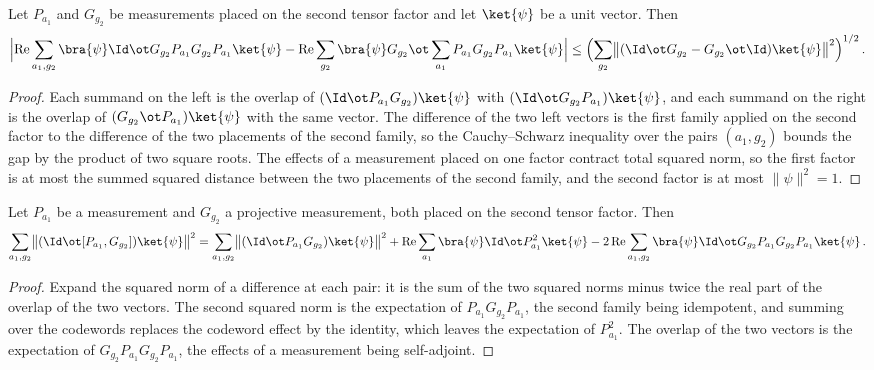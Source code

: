\begin{lemma}
	\label{lem:pasting-cross-move}
	\leanok
	Let $P_{a_1}$ and $G_{g_2}$ be measurements placed on the second tensor
	factor and let $\ket{\psi}$ be a unit vector. Then
	\[
		\Bigl| \operatorname{Re}\sum_{a_1, g_2}
			\bra{\psi} \Id \ot G_{g_2} P_{a_1} G_{g_2} P_{a_1}
			\ket{\psi} - \operatorname{Re}\sum_{g_2} \bra{\psi} G_{g_2} \ot \sum_{a_1} P_{a_1}
			G_{g_2} P_{a_1} \ket{\psi} \Bigr| \le \Bigl( \sum_{g_2} \bigl\|
			(\Id \ot G_{g_2} - G_{g_2} \ot \Id) \ket{\psi} \bigr\|^2
		\Bigr)^{1/2}\,.
	\]
\end{lemma}
\begin{proof}
	\leanok
	Each summand on the left is the overlap of
	$(\Id \ot P_{a_1} G_{g_2}) \ket{\psi}$ with
	$(\Id \ot G_{g_2} P_{a_1}) \ket{\psi}$, and each summand on the right is the
	overlap of $(G_{g_2} \ot P_{a_1}) \ket{\psi}$ with the same vector. The
	difference of the two left vectors is the first family applied on the second
	factor to the difference of the two placements of the second family, so the
	Cauchy--Schwarz inequality over the pairs $(a_1, g_2)$ bounds the gap by the
	product of two square roots. The effects of a measurement placed on one
	factor contract total squared norm, so the first factor is at most the
	summed squared distance between the two placements of the second family, and
	the second factor is at most $\|\psi\|^2 = 1$.
\end{proof}

\begin{lemma}
	\label{lem:pasting-commutator-expansion}
	\leanok
	Let $P_{a_1}$ be a measurement and $G_{g_2}$ a projective measurement, both
	placed on the second tensor factor. Then
	\[
		\sum_{a_1, g_2} \bigl\| (\Id \ot [P_{a_1}, G_{g_2}]) \ket{\psi} \bigr\|^2
		= \sum_{a_1, g_2} \bigl\| (\Id \ot P_{a_1} G_{g_2}) \ket{\psi} \bigr\|^2
			+ \operatorname{Re}\sum_{a_1} \bra{\psi} \Id \ot P_{a_1}^2 \ket{\psi}
			- 2 \operatorname{Re}\sum_{a_1, g_2}
				\bra{\psi} \Id \ot G_{g_2} P_{a_1} G_{g_2} P_{a_1}
				\ket{\psi}\,.
	\]
\end{lemma}
\begin{proof}
	\leanok
	Expand the squared norm of a difference at each pair: it is the sum of the
	two squared norms minus twice the real part of the overlap of the two
	vectors. The second squared norm is the expectation of
	$P_{a_1} G_{g_2} P_{a_1}$, the second family being idempotent, and summing
	over the codewords replaces the codeword effect by the identity, which
	leaves the expectation of $P_{a_1}^2$. The overlap of the two vectors is the
	expectation of $G_{g_2} P_{a_1} G_{g_2} P_{a_1}$, the effects of a
	measurement being self-adjoint.
\end{proof}

